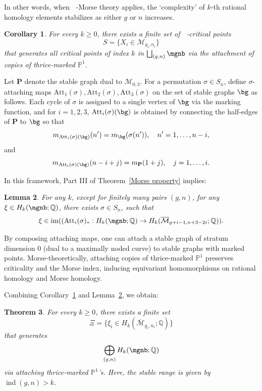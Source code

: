 \documentclass[12pt]{amsart}
\newtheorem{theorem}{Theorem}[section]
\newtheorem{lemma}[theorem]{Lemma}
\newtheorem{corollary}[theorem]{Corollary}
\theoremstyle{remark}
\theoremstyle{definition}
\DeclareMathOperator{\ind}{ind}
\DeclareMathOperator{\syst}{sys_T}
\numberwithin{equation}{section}
\begin{document}
In other words, when $\syst$-Morse theory applies, the `complexity' of $k$-th rational homology elements stabilizes as either $g$ or $n$ increases.

\begin{corollary}
\label{finite generation morse}
For every $k \ge 0$, there exists a finite set of $\syst$-critical points
\[
S = \{X_i \in \mathcal M_{g_i,n_i}\}
\]
that generates all critical points of index $k$ in $\bigsqcup_{(g,n)} \mgnb$ via the attachment of copies of thrice-marked $\mathbb P^1$.
\end{corollary}

Let $\textbf{P}$ denote the stable graph dual to $\mathcal M_{0,3}$. For a permutation $\sigma \in S_n$, define $\sigma$-attaching maps $\text{Att}_1(\sigma), \text{Att}_2(\sigma), \text{Att}_3(\sigma)$ on the set of stable graphs $\bg$ as follows. Each cycle of $\sigma$ is assigned to a single vertex of $\bg$ via the marking function, and for $i=1,2,3$, $\text{Att}_i(\sigma)(\bg)$ is obtained by connecting the half-edges of $\textbf{P}$ to $\bg$ so that
\[
m_{\text{Att}_i(\sigma)(\bg)}(n') = m_\bg(\sigma(n')), \quad n' = 1,\dots,n-i,
\]
and
\[
m_{\text{Att}_i(\sigma)(\bg)}(n-i+j) = m_\textbf{P}(1+j), \quad j=1,\dots,i.
\]

In this framework, Part III of Theorem~\ref{Morse property} implies:

\begin{lemma}
\label{in the image}
    For any $k$, except for finitely many pairs $(g,n)$, for any $\xi\in H_k(\mgnb;\mathbb Q)$, there exists $\sigma\in S_n$, such that
    \[
    \xi\in\text{im}((\text{Att}_i(\sigma)_*:H_k(\mgnb;\mathbb Q)\to H_k(\overline{\mathcal M}_{g+i-1,n+3-2i};\mathbb Q)).
    \]
\end{lemma}

By composing attaching maps, one can attach a stable graph of stratum dimension $0$ (dual to a maximally noded curve) to stable graphs with marked points. Morse-theoretically, attaching copies of thrice-marked $\mathbb P^1$ preserves criticality and the Morse index, inducing equivariant homomorphisms on rational homology and Morse homology.

Combining Corollary~\ref{finite generation morse} and Lemma~\ref{in the image}, we obtain:

\begin{theorem}
\label{finite generation}
    For every $k\ge0$, there exists a finite set
    \[
    \Xi=\{\xi_i\in H_k(\overline{\mathcal M}_{g_i,n_i};\mathbb Q)\}
    \]
    that generates
    \[
    \bigoplus_{(g,n)} H_k(\mgnb;\mathbb Q)
    \]
    via attaching thrice-marked $\mathbb P^1$'s. Here, the stable range is given by $\ind(g,n)>k$.
\end{theorem}
\end{document}
